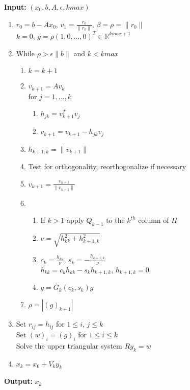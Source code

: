 \documentclass[11pt]{article}
\begin{document}
\textbf{Input:} $(x_0, b, A, \epsilon, kmax)$
\begin{enumerate}
\item $r_0 = b - A x_0$, $v_1 = \frac{r_0}{\| r_0 \|}$, $\beta = \rho = \| r_0 \|$ \\
  $k = 0$, $g = \rho (1, 0, \dots, 0)^T \in \mathbb{R}^{kmax + 1}$
\item While $\rho > \epsilon \| b \|$ and $k < kmax$
  \begin{enumerate}
  \item $k = k + 1$
  \item $v_{k+1} = A v_k$ \\
    for $j = 1, \dots, k$ \\
    \begin{enumerate}
    \item $h_{jk} = v_{k+1}^T v_j$
    \item $v_{k+1} = v_{k+1} - h_{jk} v_j$
    \end{enumerate}
  \item $h_{k+1,k} = \| v_{k+1} \|$
  \item Test for orthogonality, reorthogonalize if necessary
  \item $v_{k+1} = \frac{v_{k+1}}{\| v_{k+1} \|}$
  \item \begin{enumerate}
  \item If $k > 1$ apply $Q_{k-1}$ to the $k^{th}$ column of $H$
  \item $\nu = \sqrt{h_{kk}^2 + h_{k+1,k}^2}$
  \item $c_k = \frac{h_{kk}}{\nu}$, $s_k = -\frac{h_{k+1,k}}{\nu}$ \\
    $h_{kk} = c_k h_{kk} - s_k h_{k+1,k}$, $h_{k+1, k} = 0$
  \item $g = G_k(c_k, s_k)g$
  \end{enumerate}
  \item $\rho = |(g)_{k+1}|$
  \end{enumerate}
  \item Set $r_{ij} = h_{ij}$ for $1 \leq i$, $j \leq k$ \\
    Set $(w)_i = (g)_i$ for $1 \leq i \leq k$ \\
    Solve the upper triangular system $Ry_k = w$
  \item $x_k = x_0 + V_k y_k$
\end{enumerate}

\textbf{Output:} $x_k$
    
\end{document}
